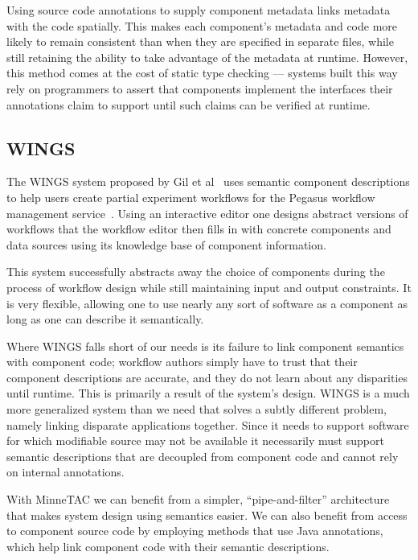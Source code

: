 \documentclass{article}
\begin{document}
Using source code annotations to supply component metadata links metadata with the code spatially.
This makes each component's metadata and code more likely to remain consistent than when they are specified in separate files, while still retaining the ability to take advantage of the metadata at runtime.
However, this method comes at the cost of static type checking --- systems built this way rely on programmers to assert that components implement the interfaces their annotations claim to support until such claims can be verified at runtime.

\subsection{WINGS}

The WINGS system proposed by Gil et al~\cite{gil2007wings} uses semantic component descriptions to help users create partial experiment workflows for the Pegasus workflow management service~\cite{callaghan2009scaling}.
Using an interactive editor one designs abstract versions of workflows that the workflow editor then fills in with concrete components and data sources using its knowledge base of component information.

This system successfully abstracts away the choice of components during the process of workflow design while still maintaining input and output constraints.
It is very flexible, allowing one to use nearly any sort of software as a component as long as one can describe it semantically.

Where WINGS falls short of our needs is its failure to link component semantics with component code; workflow authors simply have to trust that their component descriptions are accurate, and they do not learn about any disparities until runtime.
This is primarily a result of the system's design.
WINGS is a much more generalized system than we need that solves a subtly different problem, namely linking disparate applications together.
Since it needs to support software for which modifiable source may not be available it necessarily must support semantic descriptions that are decoupled from component code and cannot rely on internal annotations.

With MinneTAC we can benefit from a simpler, ``pipe-and-filter'' architecture that makes system design using semantics easier.
We can also benefit from access to component source code by employing methods that use Java annotations, which help link component code with their semantic descriptions.
\end{document}
